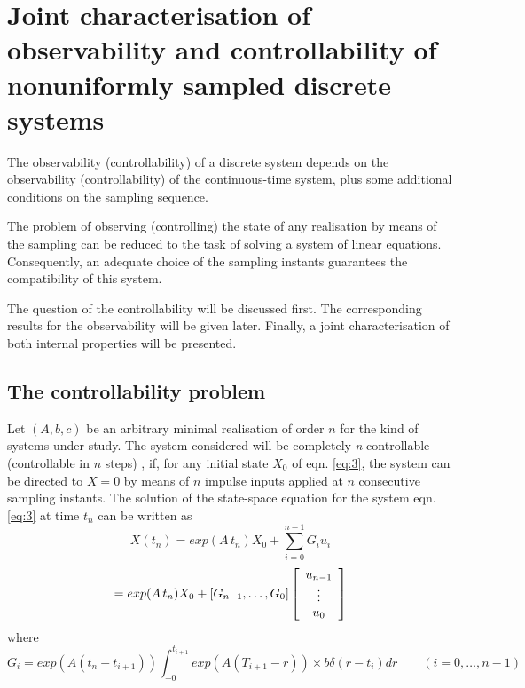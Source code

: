 \documentclass{article}
\begin{document}
\section{Joint characterisation of observability and controllability
of nonuniformly sampled discrete systems}

The observability (controllability) of a discrete system depends
on the observability (controllability) of the continuous-time
system, plus some additional conditions on the sampling sequence.

The problem of observing (controlling) the state of any
realisation by means of the sampling can be reduced to the task of
solving a system of linear equations. Consequently, an adequate
choice of the sampling instants guarantees the compatibility of
this system.

The question of the controllability will be discussed first. The
corresponding results for the observability will be given later.
Finally, a joint characterisation of both internal properties will
be presented.

\subsection{The controllability problem} Let $(A, b, c)$ be an
arbitrary minimal realisation of order $n$ for the kind of systems
under study. The system considered will be completely
\textit{n}-controllable (controllable in $n$ steps)
\cite{Ackermann}, \cite{Troch} if, for any initial state $X_0$ of
eqn. \ref{eq:3}, the system can be directed to $X = 0$ by means of
$n$ impulse inputs applied at $n$ consecutive sampling instants.
The solution of the state-space equation for the system eqn.
\ref{eq:3} at time $t_n$ can be written as
\begin{equation*}
X(t_n)= exp(A\,t_n)X_0 + \sum\limits_{i=0}^{n-1} G_i u_i
\end{equation*}
\begin{equation}\label{eq:11}
= exp(A\,t_n)X_0 + [G_{n-1}, \ldots , G_0]
\left[
  \begin{array}{c}
    u_{n-1} \\
    $\vdots$ \\
    u_0 \\
  \end{array}
\right]
\end{equation}
where
\begin{equation}\label{eq:12}
G_i = exp(A(t_n - t_{i+1})) \int _{-0}^{t_{i+1}}  exp(A(T_{i+1} - r))
\times b\delta (r-t_i)dr \qquad (i = 0, \ldots, n-1)
\end{equation}
\end{document}
